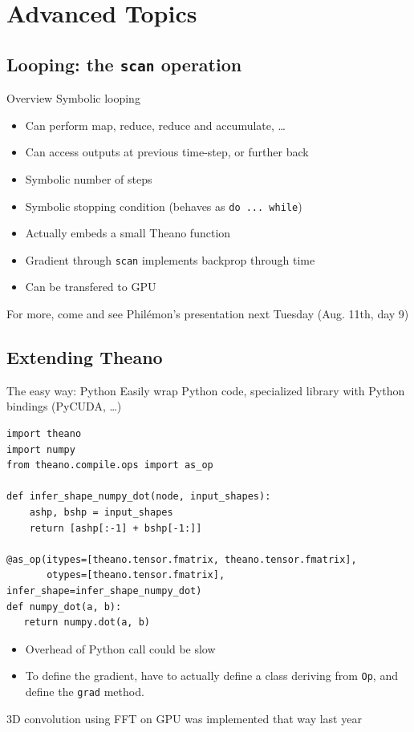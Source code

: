\documentclass[a4paper,9pt]{beamer}
\begin{document}
\section{Advanced Topics}
\begin{frame}
  \tableofcontents[currentsection]
\end{frame}

\subsection{Looping: the {\tt scan} operation}
\begin{frame}[fragile]{Overview}
  Symbolic looping
  \begin{itemize}
    \item Can perform map, reduce, reduce and accumulate, \ldots
    \item Can access outputs at previous time-step, or further back
    \item Symbolic number of steps
    \item Symbolic stopping condition (behaves as \verb|do ... while|)
    \item Actually embeds a small Theano function
    \item Gradient through \verb|scan| implements backprop through time
    \item Can be transfered to GPU
  \end{itemize}
  For more, come and see Philémon's presentation next Tuesday (Aug. 11th, day 9)
\end{frame}


\subsection{Extending Theano}

\begin{frame}[fragile]{The easy way: Python}
\small
  Easily wrap Python code, specialized library with Python bindings (PyCUDA, \ldots)

  \begin{verbatim}
import theano
import numpy
from theano.compile.ops import as_op

def infer_shape_numpy_dot(node, input_shapes):
    ashp, bshp = input_shapes
    return [ashp[:-1] + bshp[-1:]]

@as_op(itypes=[theano.tensor.fmatrix, theano.tensor.fmatrix],
       otypes=[theano.tensor.fmatrix], infer_shape=infer_shape_numpy_dot)
def numpy_dot(a, b):
   return numpy.dot(a, b)

  \end{verbatim}
  \begin{itemize}
    \item Overhead of Python call could be slow
    \item To define the gradient, have to actually define a class deriving from \verb|Op|,
      and define the \verb|grad| method.
  \end{itemize}
  3D convolution using FFT on GPU was implemented that way last year
\end{frame}
\end{document}

